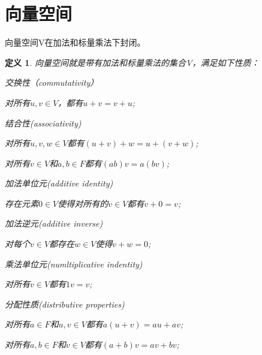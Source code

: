 \documentclass[11pt, b5paper, oneside]{book}
\newtheorem{definition}[theorem]{定义}
\begin{document}
\section{向量空间}

向量空间V在加法和标量乘法下封闭。

\begin{definition}
    向量空间就是带有加法和标量乘法的集合V，满足如下性质：

    \emph{交换性（commutativity）}
    \begin{center}
        对所有$u,v \in V$，都有$u+v=v+u$;
    \end{center}
    
    \emph{结合性(associativity)}
    \begin{center}
        对所有$u,v,w \in V$都有$(u+v)+w=u+(v+w)$;

        对所有$v \in V$和$a,b \in F$都有$(ab)v=a(bv)$;
    \end{center}

    \emph{加法单位元(additive identity)}
    \begin{center}
        存在元素$0 \in V$使得对所有的$v \in V$都有$v+0=v$;
    \end{center}

    \emph{加法逆元(additive inverse)}
    \begin{center}
        对每个$v \in V$都存在$w \in V$使得$v+w=0$;
    \end{center}

    \emph{乘法单位元(numltiplicative indentity)}
    \begin{center}
        对所有$v \in V$都有$1v=v$;
    \end{center}

    \emph{分配性质(distributive properties)}
    \begin{center}
        对所有$a \in F$和$u,v \in V$都有$a(u+v)=au+av$;
        
        对所有$a,b \in F$和$v \in V$都有$(a+b)v=av+bv$;
    \end{center}
    
\end{definition}
\end{document}
